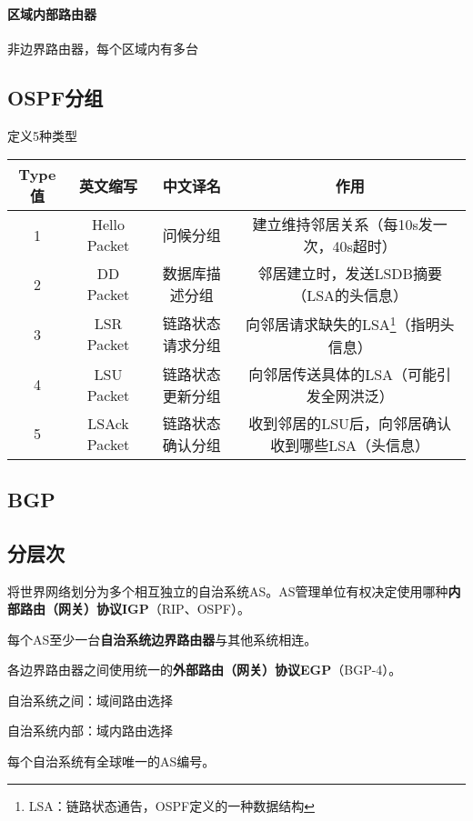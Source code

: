 \paragraph{区域内部路由器}
非边界路由器，每个区域内有多台


\subsection{OSPF分组}
定义5种类型
{\footnotesize\begin{center}
    \begin{tabular}{|c|c|c|c|}
        \hline
        Type值 & 英文缩写 & 中文译名 & 作用 \\
        \hline
        1 & Hello Packet & 问候分组 & 建立维持邻居关系（每10s发一次，40s超时） \\ 
        \hline
        2 & DD Packet & 数据库描述分组 & 邻居建立时，发送LSDB摘要（LSA的头信息） \\ 
        \hline
        3 & LSR Packet & 链路状态请求分组 & 向邻居请求缺失的LSA\footnote{LSA：链路状态通告，OSPF定义的一种数据结构}（指明头信息） \\ 
        \hline
        4 & LSU Packet & 链路状态更新分组 & 向邻居传送具体的LSA（可能引发全网洪泛） \\ 
        \hline
        5 & LSAck Packet & 链路状态确认分组 & 收到邻居的LSU后，向邻居确认收到哪些LSA（头信息） \\ 
        \hline
    \end{tabular}
\end{center}}


\subsection{BGP}


\subsection{分层次}
将世界网络划分为多个相互独立的自治系统AS。AS管理单位有权决定使用哪种\textbf{内部路由（网关）协议IGP}（RIP、OSPF）。

每个AS至少一台\textbf{自治系统边界路由器}与其他系统相连。

各边界路由器之间使用统一的\textbf{外部路由（网关）协议EGP}（BGP-4）。

自治系统之间：域间路由选择

自治系统内部：域内路由选择

每个自治系统有全球唯一的AS编号。


